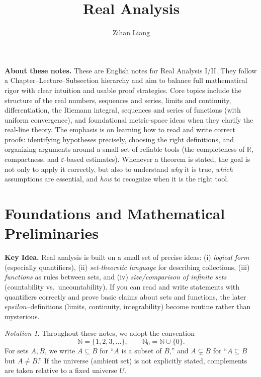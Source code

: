 \documentclass[12pt]{article}
\title{Real Analysis}
\author{Zihan Liang}
\numberwithin{equation}{section}
\def\eps{epsilon}
\newcommand{\RR}{\mathbb{R}}
\newcommand{\NN}{\mathbb{N}}
\newcommand{\eps}{\varepsilon}               %
\theoremstyle{plain}
\theoremstyle{definition}
\theoremstyle{remark}
\newtheorem{notation}[theorem]{Notation}
\newenvironment{keyidea}{\begin{tcolorbox}\textbf{Key Idea.}}{\end{tcolorbox}}
\begin{document}
\maketitle

\noindent\textbf{About these notes.}
These are English notes for Real Analysis I/II.
They follow a Chapter--Lecture--Subsection hierarchy and aim to balance full mathematical rigor with clear intuition and usable proof strategies.
Core topics include the structure of the real numbers, sequences and series, limits and continuity, differentiation, the Riemann integral, sequences and series of functions (with uniform convergence), and foundational metric-space ideas when they clarify the real-line theory.
The emphasis is on learning how to read and write correct proofs: identifying hypotheses precisely, choosing the right definitions, and organizing arguments around a small set of reliable tools (the completeness of $\RR$, compactness, and $\varepsilon$-based estimates).
Whenever a theorem is stated, the goal is not only to apply it correctly, but also to understand \emph{why} it is true, \emph{which} assumptions are essential, and \emph{how} to recognize when it is the right tool.


\tableofcontents
\newpage


\section{Foundations and Mathematical Preliminaries}

\begin{keyidea}
Real analysis is built on a small set of precise ideas: (i) \emph{logical form} (especially quantifiers), (ii) \emph{set-theoretic language} for describing collections, (iii) \emph{functions} as rules between sets, and (iv) \emph{size/comparison of infinite sets} (countability vs.\ uncountability).  
If you can read and write statements with quantifiers correctly and prove basic claims about sets and functions, the later $\eps$--definitions (limits, continuity, integrability) become routine rather than mysterious.
\end{keyidea}

\begin{notation}
Throughout these notes, we adopt the convention
\[
\NN = \{1,2,3,\dots\}, \qquad \NN_0 = \NN \cup \{0\}.
\]
For sets $A,B$, we write $A \subseteq B$ for ``$A$ is a subset of $B$,'' and $A \subsetneq B$ for ``$A\subseteq B$ but $A\neq B$.''  
If the universe (ambient set) is not explicitly stated, complements are taken relative to a fixed universe $U$.
\end{notation}
\end{document}
